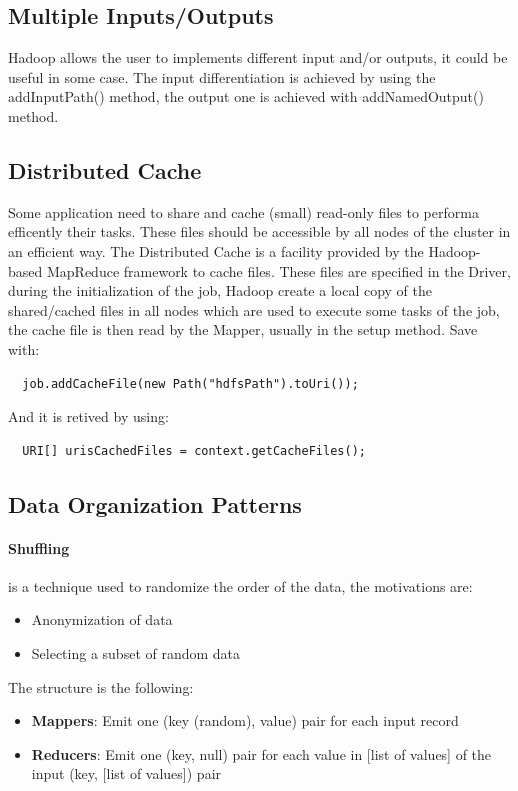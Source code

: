 \documentclass[12pt]{article}
\begin{document}
\subsection{Multiple Inputs/Outputs}
Hadoop allows the user to implements different input and/or outputs, it could be useful in some case. The input differentiation is achieved by using the addInputPath() method, the output one is achieved with addNamedOutput() method.

\subsection{Distributed Cache}
Some application need to share and cache (small) read-only files to performa efficently their tasks. These files should be accessible by all nodes of the cluster in an efficient way. The Distributed Cache is a facility provided by the Hadoop-based MapReduce framework to cache files.
These files are specified in the Driver, during the initialization of the job, Hadoop create a local copy of the shared/cached files in all nodes which are used to execute some tasks of the job, the cache file is then read by the Mapper, usually in the setup method.
Save with:
\begin{lstlisting}
  job.addCacheFile(new Path("hdfsPath").toUri());
\end{lstlisting}
And it is retived by using:
\begin{lstlisting}
  URI[] urisCachedFiles = context.getCacheFiles();
\end{lstlisting}

\subsection{Data Organization Patterns}
\paragraph{Shuffling} is a technique used to randomize the order of the data, the motivations are:
\begin{itemize}
  \item Anonymization of data
  \item Selecting a subset of random data
\end{itemize}
The structure is the following:
\begin{itemize}
  \item \textbf{Mappers}: Emit one (key (random), value) pair for each input record
  \item \textbf{Reducers}: Emit one (key, null) pair for each value in [list of values] of the input (key, [list of values]) pair
\end{itemize}
\end{document}
